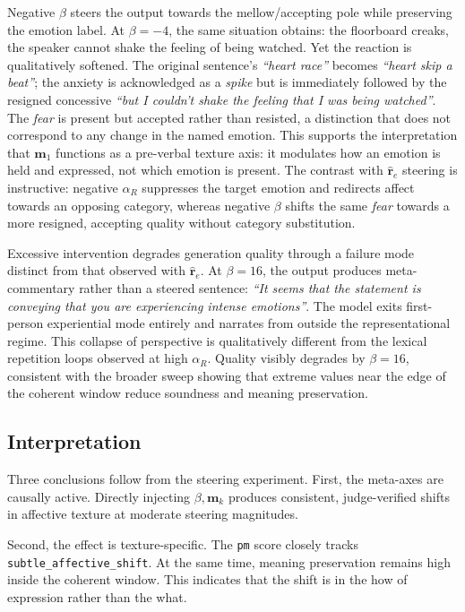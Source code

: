 Negative $\beta$ steers the output towards the mellow/accepting pole while preserving the emotion label. At $\beta=-4$, the same situation obtains: the floorboard creaks, the speaker cannot shake the feeling of being watched. Yet the reaction is qualitatively softened. The original sentence's \textit{``heart race''} becomes \textit{``heart skip a beat''}; the anxiety is acknowledged as a \textit{spike} but is immediately followed by the resigned concessive \textit{``but I couldn't shake the feeling that I was being watched''}. The \textit{fear} is present but accepted rather than resisted, a distinction that does not correspond to any change in the named emotion. This supports the interpretation that $\mathbf{m}_1$ functions as a pre-verbal texture axis: it modulates how an emotion is held and expressed, not which emotion is present. The contrast with $\hat{\mathbf{r}}_e$ steering is instructive: negative $\alpha_R$ suppresses the target emotion and redirects affect towards an opposing category, whereas negative $\beta$ shifts the same \textit{fear} towards a more resigned, accepting quality without category substitution.\par

Excessive intervention degrades generation quality through a failure mode distinct from that observed with $\hat{\mathbf{r}}_e$. At $\beta=16$, the output produces meta-commentary rather than a steered sentence: \textit{``It seems that the statement is conveying that you are experiencing intense emotions''}. The model exits first-person experiential mode entirely and narrates from outside the representational regime. This collapse of perspective is qualitatively different from the lexical repetition loops observed at high $\alpha_R$. Quality visibly degrades by $\beta=16$, consistent with the broader sweep showing that extreme values near the edge of the coherent window reduce soundness and meaning preservation.\par

\subsection{Interpretation}

Three conclusions follow from the steering experiment. First, the meta-axes are causally active. Directly injecting $\beta,\mathbf{m}_k$ produces consistent, judge-verified shifts in affective texture at moderate steering magnitudes.\par

Second, the effect is texture-specific. The \texttt{pm} score closely tracks \texttt{subtle\_affective\_shift}. At the same time, meaning preservation remains high inside the coherent window. This indicates that the shift is in the how of expression rather than the what.\par

